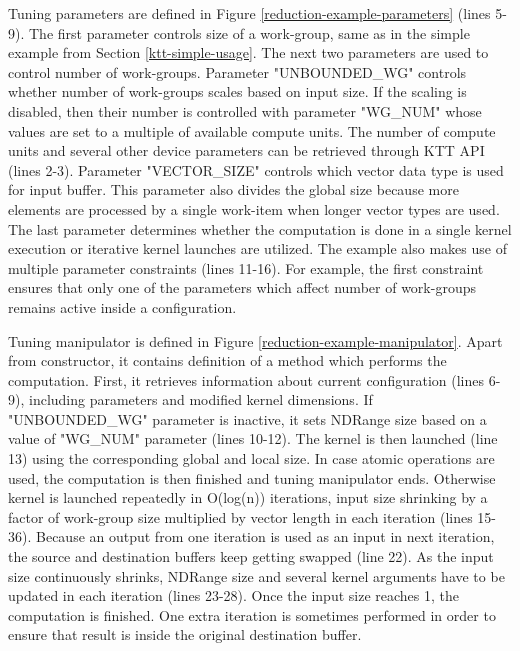 \documentclass
[
    digital, %
    oneside, %
    table, %
    nolof, %
    nolot, %
    nocover %
]{fithesis3}
\begin{document}
Tuning parameters are defined in Figure \ref{reduction-example-parameters} (lines 5-9). The first parameter controls size of a work-group, same as in
the simple example from Section \ref{ktt-simple-usage}. The next two parameters are used to control number of work-groups. Parameter "UNBOUNDED\_WG" controls
whether number of work-groups scales based on input size. If the scaling is disabled, then their number is controlled with parameter "WG\_NUM" whose
values are set to a multiple of available compute units. The number of compute units and several other device parameters can be retrieved through KTT API
(lines 2-3). Parameter "VECTOR\_SIZE" controls which vector data type is used for input buffer. This parameter also divides the global size because
more elements are processed by a single work-item when longer vector types are used. The last parameter determines whether the computation is done
in a single kernel execution or iterative kernel launches are utilized. The example also makes use of multiple parameter constraints (lines 11-16).
For example, the first constraint ensures that only one of the parameters which affect number of work-groups remains active inside a configuration.

Tuning manipulator is defined in Figure \ref{reduction-example-manipulator}. Apart from constructor, it contains definition of a method which performs
the computation. First, it retrieves information about current configuration (lines 6-9), including parameters and modified kernel dimensions. If
"UNBOUNDED\_WG" parameter is inactive, it sets NDRange size based on a value of "WG\_NUM" parameter (lines 10-12). The kernel is then launched (line 13)
using the corresponding global and local size. In case atomic operations are used, the computation is then finished and tuning manipulator ends. Otherwise
kernel is launched repeatedly in O(log(n)) iterations, input size shrinking by a factor of work-group size multiplied by vector length in each iteration
(lines 15-36). Because an output from one iteration is used as an input in next iteration, the source and destination buffers keep getting swapped (line 22).
As the input size continuously shrinks, NDRange size and several kernel arguments have to be updated in each iteration (lines 23-28). Once the input size
reaches 1, the computation is finished. One extra iteration is sometimes performed in order to ensure that result is inside the original destination buffer.
\end{document}
